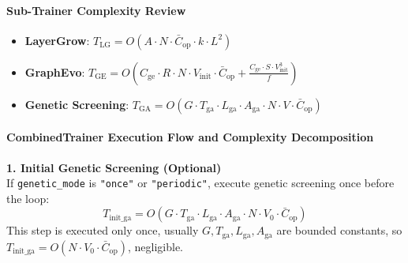 \paragraph{Sub-Trainer Complexity Review}
\begin{itemize}
    \item \textbf{LayerGrow}: $T_{\mathrm{LG}} = O(A \cdot N \cdot \bar{C}_{\mathrm{op}} \cdot k \cdot L^2)$
    \item \textbf{GraphEvo}: $T_{\mathrm{GE}} = O(C_{\mathrm{ge}} \cdot R \cdot N \cdot V_{\mathrm{init}} \cdot \bar{C}_{\mathrm{op}} + \frac{C_{\mathrm{ge}} \cdot S \cdot V_{\mathrm{init}}^3}{f})$
    \item \textbf{Genetic Screening}: $T_{\mathrm{GA}} = O(G \cdot T_{\mathrm{ga}} \cdot L_{\mathrm{ga}} \cdot A_{\mathrm{ga}} \cdot N \cdot V \cdot \bar{C}_{\mathrm{op}})$
\end{itemize}

\paragraph{CombinedTrainer Execution Flow and Complexity Decomposition}

\textbf{1. Initial Genetic Screening (Optional)} \\
If \texttt{genetic\_mode} is \texttt{"once"} or \texttt{"periodic"}, execute genetic screening once before the loop:
\begin{equation}
    T_{\mathrm{init\_ga}} = O(G \cdot T_{\mathrm{ga}} \cdot L_{\mathrm{ga}} \cdot A_{\mathrm{ga}} \cdot N \cdot V_0 \cdot \bar{C}_{\mathrm{op}})
\end{equation}
This step is executed only once, usually $G, T_{\mathrm{ga}}, L_{\mathrm{ga}}, A_{\mathrm{ga}}$ are bounded constants, so $T_{\mathrm{init\_ga}} = O(N \cdot V_0 \cdot \bar{C}_{\mathrm{op}})$, negligible.

